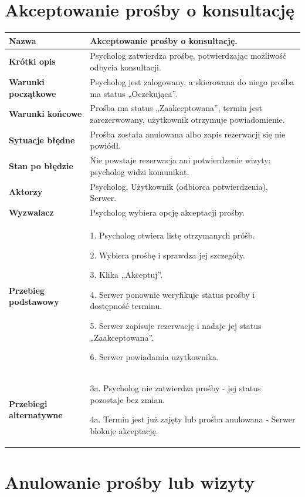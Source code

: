 \documentclass[11pt,a4paper]{article}
\renewcommand{\arraystretch}{1.3}
\newcommand{\pole}[2]{
\textbf{#1} & #2 \\ \hline
}
\begin{document}
\clearpage

\section*{Akceptowanie prośby o konsultację}

\begingroup
\small
\renewcommand{\arraystretch}{1.14}

\begin{tabularx}{\textwidth}{|p{3.9cm}|Y|}
\hline

\pole{Nazwa}{
Akceptowanie prośby o konsultację.
}

\pole{Krótki opis}{
Psycholog zatwierdza prośbę,
potwierdzając możliwość odbycia konsultacji.
}

\pole{Warunki początkowe}{
Psycholog jest zalogowany,
a skierowana do niego prośba
ma status „Oczekująca”.
}

\pole{Warunki końcowe}{
Prośba ma status „Zaakceptowana”,
termin jest zarezerwowany,
użytkownik otrzymuje powiadomienie.
}

\pole{Sytuacje błędne}{
Prośba została anulowana albo zapis
rezerwacji się nie powiódł.
}

\pole{Stan po błędzie}{
Nie powstaje rezerwacja ani potwierdzenie
wizyty; psycholog widzi komunikat.
}

\pole{Aktorzy}{
Psycholog,
Użytkownik (odbiorca potwierdzenia),
Serwer.
}

\pole{Wyzwalacz}{
Psycholog wybiera opcję akceptacji prośby.
}

\pole{Przebieg podstawowy}{
1. Psycholog otwiera listę otrzymanych próśb.\par
2. Wybiera prośbę i sprawdza jej szczegóły.\par
3. Klika „Akceptuj”.\par
4. Serwer ponownie weryfikuje status prośby
i dostępność terminu.\par
5. Serwer zapisuje rezerwację
i nadaje jej status „Zaakceptowana”.\par
6. Serwer powiadamia użytkownika.
}

\pole{Przebiegi alternatywne}{
3a. Psycholog nie zatwierdza prośby -
jej status pozostaje bez zmian.\par
4a. Termin jest już zajęty lub prośba
anulowana - Serwer blokuje akceptację.
}

\end{tabularx}
\endgroup

\clearpage

\section*{Anulowanie prośby lub wizyty}
\end{document}
